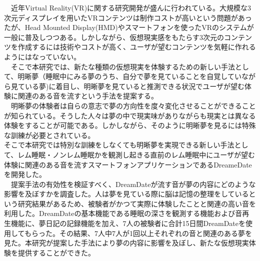 
\begin{jabstract}
　近年Virtual Reality(VR)に関する研究開発が盛んに行われている。大規模な3次元ディスプレイを用いたVRコンテンツは制作コストが高いという問題があったが、Head Mounted Display(HMD)やスマートフォンを使ったVRのシステムが一般に普及しつつある。しかしながら、仮想現実感をもたらす3次元のコンテンツを作成するには技術やコストが高く、ユーザが望むコンテンツを気軽に作れるようにはなっていない。\\
　そこで本研究では、新たな種類の仮想現実を体験するための新しい手法として、明晰夢（睡眠中にみる夢のうち、自分で夢を見ていることを自覚していながら見ている夢)に着目し、明晰夢を見ていると推測できる状況でユーザが望む体験に関連のある音を流すという手法を提案する。\\
　明晰夢の体験者は自らの意志で夢の方向性を度々変化させることができることが知られている。そうした人々は夢の中で現実味がありながらも現実とは異なる体験をすることが可能である。しかしながら、そのように明晰夢を見るには特殊な訓練が必要とされている。  \\
 そこで本研究では特別な訓練をしなくても明晰夢を実現できる新しい手法として、レム睡眠・ノンレム睡眠かを観測し起きる直前のレム睡眠中にユーザが望む体験に関連のある音を流すスマートフォンアプリケーションであるDreameDateを開発した。\\
　提案手法の有効性を検証すべく、DreamDateが流す音が夢の内容にどのような影響を及ぼすかを調査した。人は夢を見ている際に脳は記憶の整理をしているという研究結果があるため、被験者がかつて実際に体験したことと関連の高い音を利用した。DreamDateの基本機能である睡眠の深さを観測する機能および音再生機能に、夢日記の記録機能を加え、7人の被験者に合計15日間DreamDateを使用してもらった。その結果、7人中7人が1回以上それぞれの音と関連のある夢を見た。本研究が提案した手法により夢の内容に影響を及ぼし、新たな仮想現実体験を提供することができた。


\end{jabstract}

